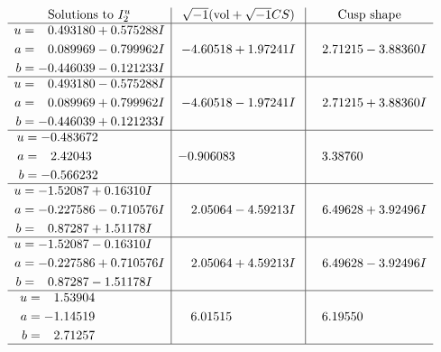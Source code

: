 \documentclass[1p]{elsarticle_modified}
\theoremstyle{definition}
\newcommand{\I}{\sqrt{-1}}
\begin{document}
$$\begin{array}{c|c|c}  
\text{Solutions to }I^u_{2}& \I (\text{vol} + \sqrt{-1}CS) & \text{Cusp shape}\\
 \hline 
\begin{aligned}
u &= \phantom{-}0.493180 + 0.575288 I \\
a &= \phantom{-}0.089969 - 0.799962 I \\
b &= -0.446039 - 0.121233 I\end{aligned}
 & -4.60518 + 1.97241 I & \phantom{-}2.71215 - 3.88360 I \\ \hline\begin{aligned}
u &= \phantom{-}0.493180 - 0.575288 I \\
a &= \phantom{-}0.089969 + 0.799962 I \\
b &= -0.446039 + 0.121233 I\end{aligned}
 & -4.60518 - 1.97241 I & \phantom{-}2.71215 + 3.88360 I \\ \hline\begin{aligned}
u &= -0.483672\phantom{ +0.000000I} \\
a &= \phantom{-}2.42043\phantom{ +0.000000I} \\
b &= -0.566232\phantom{ +0.000000I}\end{aligned}
 & -0.906083\phantom{ +0.000000I} & \phantom{-}3.38760\phantom{ +0.000000I} \\ \hline\begin{aligned}
u &= -1.52087 + 0.16310 I \\
a &= -0.227586 - 0.710576 I \\
b &= \phantom{-}0.87287 + 1.51178 I\end{aligned}
 & \phantom{-}2.05064 - 4.59213 I & \phantom{-}6.49628 + 3.92496 I \\ \hline\begin{aligned}
u &= -1.52087 - 0.16310 I \\
a &= -0.227586 + 0.710576 I \\
b &= \phantom{-}0.87287 - 1.51178 I\end{aligned}
 & \phantom{-}2.05064 + 4.59213 I & \phantom{-}6.49628 - 3.92496 I \\ \hline\begin{aligned}
u &= \phantom{-}1.53904\phantom{ +0.000000I} \\
a &= -1.14519\phantom{ +0.000000I} \\
b &= \phantom{-}2.71257\phantom{ +0.000000I}\end{aligned}
 & \phantom{-}6.01515\phantom{ +0.000000I} & \phantom{-}6.19550\phantom{ +0.000000I}\\
 \hline 
 \end{array}$$\newpage
\end{document}
